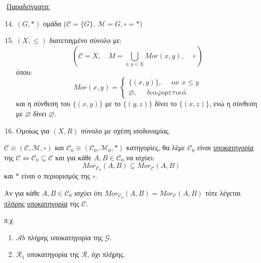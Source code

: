 \vspace{0.3truecm}

$ $\newline
\underline{Παραδείγματα:}
\begin{enumerate}
    \setcounter{enumi}{13}
    \item $(G,*)$ ομάδα ($\mathcal{C} = \{G\}$, $\mathcal{M} = G, \circ = *$)
    \item $(X,\leq)$ διατεταγμένο σύνολο με:
    $$\left( \mathcal{C} = X, \quad M = \bigcup\limits_{x,y \in X} Mor(x,y), \quad \circ \right) $$ όπου:
    $$Mor(x,y) = \begin{cases} \{(x,y)\}, \quad \text{ αν } x \leq y \\
        \varnothing, \quad \text{ διαφορετικά }
    \end{cases}$$ και η σύνθεση του $\{(x,y)\}$ με το $\{(y,z)\}$ δίνει το $\{(x,z)\}$, ενώ η σύνθεση με $\varnothing$ δίνει $\varnothing$.

    \item Ομοίως για $(X,R)$ σύνολο με σχέση ισοδυναμίας.
\end{enumerate}


\begin{defn} $\mathcal{C} \equiv (\mathcal{C},\mathcal{M},\circ)$ και $\mathcal{C}_0 \equiv (\mathcal{C}_0, \mathcal{M}_0, *)$ κατηγορίες, θα λέμε $\mathcal{C}_0$ είναι \underline{υποκατηγορία} της $\mathcal{C} \iff \mathcal{C}_0 \subseteq \mathcal{C}$ και για κάθε $A,B \in \mathcal{C}_0$ να ισχύει:
    $$Mor_{\mathcal{C}_0} (A,B) \subseteq Mor_{\mathcal{C}}(A,B)$$ και $*$ είναι ο περιορισμός της $\circ$.
    
    Αν για κάθε $A,B \in \mathcal{C}_0$ ισχύει ότι $Mor_{\mathcal{C}_0}(A,B) = Mor_{\mathcal{C}}(A,B)$ τότε λέγεται \underline{πλήρης} \underline{υποκατηγορία} της $\mathcal{C}$.
\end{defn}

π.χ.

\begin{enumerate}
    \item $\mathcal{A}b$ πλήρης υποκατηγορία της $\mathcal{G}$.
    \item $\mathcal{R}_1$ υποκατηγορία της $\mathcal{R}$, όχι πλήρης.
\end{enumerate}


